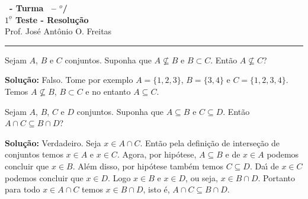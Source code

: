 \documentclass[12pt]{exam}
\begin{document}
\begin{center}
{\Large\bf \disciplina\ - Turma \turma\ -- \semestre$^{o}$/\ano} \\ \vspace{9pt} {\large\bf
$1^{\underline{o}}$ Teste - Resolu\c{c}\~ao}\\
\vspace{9pt} Prof. Jos{\'e} Ant{\^o}nio O. Freitas
\end{center}
\hrule

\vspace{.6cm}


\vspace{.6cm}

\questao Sejam $A$, $B$ e $C$ conjuntos. Suponha que $A \nsubseteq B$ e $B \subset C$. Ent\~ao $A \nsubseteq C$?

\noindent\textbf{Solu\c{c}\~ao:} Falso. Tome por exemplo $A = \{1,2,3\}$, $B = \{3,4\}$ e $C = \{1,2,3,4\}$. Temos $A \nsubseteq B$, $B \subset C$ e no entanto $A \subseteq C$.

\vspace{.5cm}

\questao Sejam $A$, $B$, $C$ e $D$ conjuntos. Suponha que $A \subseteq B$ e $C \subseteq D$. Ent\~ao $A \cap C \subseteq B \cap D$?

\noindent\textbf{Solu\c{c}\~ao:} Verdadeiro. Seja $x \in A \cap C$. Ent\~ao pela defini\c{c}\~ao de interse\c{c}\~ao de conjuntos temos $x \in A$ e $x \in C$. Agora, por hip\'otese, $A \subseteq B$ e de $x \in A$ podemos concluir que $x \in B$. Al\'em disso, por hip\'otese tamb\'em temos $C \subseteq D$. Da{\'\i} de $x \in C$ podemos concluir que $x \in D$. Logo $x \in B$ e $x \in D$, ou seja, $x \in B \cap D$. Portanto para todo $x \in A \cap C$ temos $x \in B \cap D$, isto \'e, $A \cap C \subseteq B \cap D$.
\end{document}
